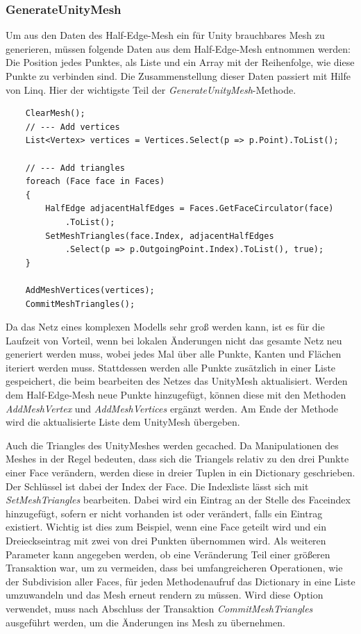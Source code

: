 \subsubsection{GenerateUnityMesh}
Um aus den Daten des Half-Edge-Mesh ein f\"ur Unity brauchbares Mesh zu generieren, m\"ussen folgende Daten aus dem Half-Edge-Mesh entnommen werden: Die Position jedes Punktes, als Liste und ein Array mit der Reihenfolge, wie diese Punkte zu verbinden sind. Die Zusammenstellung dieser Daten passiert mit Hilfe von Linq. Hier der wichtigste Teil der \textit{GenerateUnityMesh}-Methode.
\begin{lstlisting}
	ClearMesh();
	// --- Add vertices
	List<Vertex> vertices = Vertices.Select(p => p.Point).ToList();

	// --- Add triangles
	foreach (Face face in Faces)
	{
		HalfEdge adjacentHalfEdges = Faces.GetFaceCirculator(face)
			.ToList();
		SetMeshTriangles(face.Index, adjacentHalfEdges
			.Select(p => p.OutgoingPoint.Index).ToList(), true);
	}

	AddMeshVertices(vertices);
	CommitMeshTriangles();
\end{lstlisting}
Da das Netz eines komplexen Modells sehr gro{\ss} werden kann, ist es f\"ur die Laufzeit von Vorteil, wenn bei lokalen \"Anderungen nicht das gesamte Netz neu generiert werden muss, wobei jedes Mal \"uber alle Punkte, Kanten und Fl\"achen iteriert werden muss. Stattdessen werden alle Punkte zus\"atzlich in einer Liste gespeichert, die beim bearbeiten des Netzes das UnityMesh aktualisiert. Werden dem Half-Edge-Mesh neue Punkte hinzugef\"ugt, k\"onnen diese mit den Methoden \textit{AddMeshVertex} und \textit{AddMeshVertices} erg\"anzt werden. Am Ende der Methode wird die aktualisierte Liste dem UnityMesh \"ubergeben. 

Auch die Triangles des UnityMeshes werden gecached. Da Manipulationen des Meshes in der Regel bedeuten, dass sich die Triangels relativ zu den drei Punkte einer Face ver\"andern, werden diese in dreier Tuplen in ein Dictionary geschrieben. Der Schl\"ussel ist dabei der Index der Face. Die Indexliste l\"asst sich mit \textit{SetMeshTriangles} bearbeiten. Dabei wird ein Eintrag an der Stelle des Faceindex hinzugef\"ugt, sofern er nicht vorhanden ist oder ver\"andert, falls ein Eintrag existiert. Wichtig ist dies zum Beispiel, wenn eine Face geteilt wird und ein Dreieckseintrag mit zwei von drei Punkten \"ubernommen wird. Als weiteren Parameter kann angegeben werden, ob eine Ver\"anderung Teil einer gr\"o{\ss}eren Transaktion war, um zu vermeiden, dass bei umfangreicheren Operationen, wie der Subdivision aller Faces, f\"ur jeden Methodenaufruf das Dictionary in eine Liste umzuwandeln und das Mesh erneut rendern zu m\"ussen. Wird diese Option verwendet, muss nach Abschluss der Transaktion \textit{CommitMeshTriangles} ausgef\"uhrt werden, um die \"Anderungen ins Mesh zu \"ubernehmen.

